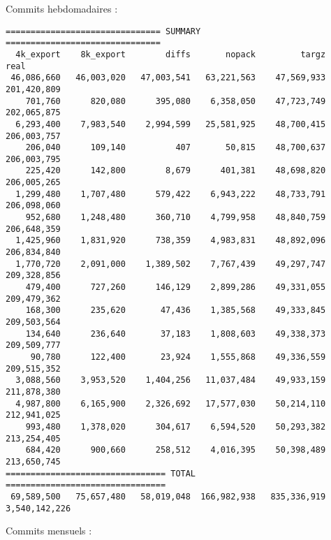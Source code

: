 \documentclass[a4paper]{article}
\begin{document}
Commits hebdomadaires :

\begin{verbatim}
=============================== SUMMARY ===============================
  4k_export    8k_export        diffs       nopack         targz           real
 46,086,660   46,003,020   47,003,541   63,221,563    47,569,933    201,420,809
    701,760      820,080      395,080    6,358,050    47,723,749    202,065,875
  6,293,400    7,983,540    2,994,599   25,581,925    48,700,415    206,003,757
    206,040      109,140          407       50,815    48,700,637    206,003,795
    225,420      142,800        8,679      401,381    48,698,820    206,005,265
  1,299,480    1,707,480      579,422    6,943,222    48,733,791    206,098,060
    952,680    1,248,480      360,710    4,799,958    48,840,759    206,648,359
  1,425,960    1,831,920      738,359    4,983,831    48,892,096    206,834,840
  1,770,720    2,091,000    1,389,502    7,767,439    49,297,747    209,328,856
    479,400      727,260      146,129    2,899,286    49,331,055    209,479,362
    168,300      235,620       47,436    1,385,568    49,333,845    209,503,564
    134,640      236,640       37,183    1,808,603    49,338,373    209,509,777
     90,780      122,400       23,924    1,555,868    49,336,559    209,515,352
  3,088,560    3,953,520    1,404,256   11,037,484    49,933,159    211,878,380
  4,987,800    6,165,900    2,326,692   17,577,030    50,214,110    212,941,025
    993,480    1,378,020      304,617    6,594,520    50,293,382    213,254,405
    684,420      900,660      258,512    4,016,395    50,398,489    213,650,745
================================ TOTAL ================================
 69,589,500   75,657,480   58,019,048  166,982,938   835,336,919  3,540,142,226
\end{verbatim}

Commits mensuels :
\end{document}
